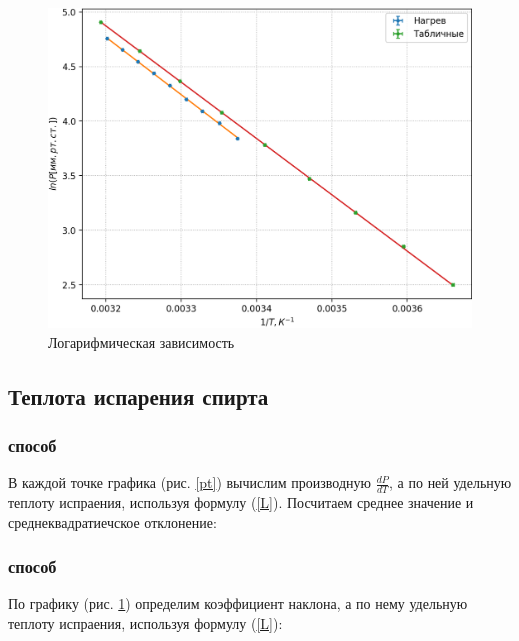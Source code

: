 \documentclass[a4paper,12pt]{article} %
\begin{document}
\begin{figure}[h!]
\begin{center}
\includegraphics[width=1\textwidth]{lnP(T^-1).png}
\caption{Логарифмическая зависимость}\label{lnpt}
\end{center}
\end{figure}

\subsection*{Теплота испарения спирта}

\subsubsection*{ способ}

В каждой точке графика (рис. \ref{pt}) вычислим производную $\frac{dP}{dT}$, а по ней удельную теплоту испраения, используя формулу (\ref{L}). Посчитаем среднее значение и среднеквадратиечское отклонение:
\begin{equation}\label{L1h}
    
\end{equation}
\begin{equation}\label{L1t}
    
\end{equation}

\subsubsection*{ способ}

По графику (рис. \ref{lnpt}) определим коэффициент наклона, а по нему удельную теплоту испраения, используя формулу (\ref{L}):
\begin{equation}\label{L2h}
    
\end{equation}
\begin{equation}\label{L2t}
    
\end{equation}
\end{document}
